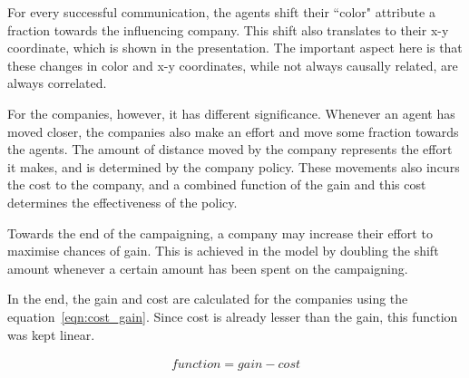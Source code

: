 For every successful communication, the agents shift their ``color" attribute a fraction towards the influencing company. This shift also translates to their x-y coordinate, which is shown in the presentation. The important aspect here is that these changes in color and x-y coordinates, while not always causally related, are always correlated. 

For the companies, however, it has different significance. Whenever an agent has moved closer, the companies also make an effort and move some fraction towards the agents. The amount of distance moved by the company represents the effort it makes, and is determined by the company policy. These movements also incurs the cost to the company, and a combined function of the gain and this cost determines the effectiveness of the policy.

Towards the end of the campaigning, a company may increase their effort to maximise chances of gain. This is achieved in the model by doubling the shift amount whenever a certain amount has been spent on the campaigning.


In the end, the gain and cost are calculated for the companies using the equation~\ref{eqn:cost_gain}. Since cost is already lesser than the gain, this function was kept linear.

\begin{eqnarray}
function = gain - cost \\
\label{eqn:cost_gain}
\end{eqnarray}



